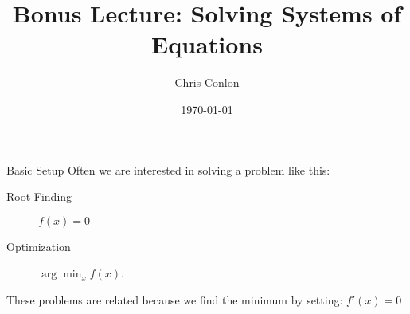 \def\beamerclassoptions{[xcolor=pdftex,dvipsnames,table,mathserif,aspectratio=169]}


\usepackage[english]{babel}
\usepackage{pgf,pgfarrows,pgfnodes,pgfautomata,pgfheaps}
\usepackage{amsmath,amssymb,setspace,centernot,stmaryrd}
\usepackage[latin1]{inputenc}
\usepackage[T1]{fontenc}
\usepackage{relsize}




\newcommand{\norm}[1]{\left\lVert#1\right\rVert}
\newcommand{\R}{\mathbb{R}}
\newcommand{\E}{\mathbb{E}}
\newcommand{\V}{\mathbb{V}}
\newcommand{\ol}{\overline}
\newcommand{\pp}{{\prime \prime}}
\newcommand{\ppp}{{\prime \prime \prime}}
\newcommand{\policy}{\gamma}


\newcommand{\fp}{\frame[plain]}


\title{Bonus Lecture: Solving Systems of Equations}
\author{Chris Conlon  }
\date{\today }


\begin{frame}
\titlepage
\end{frame}

\begin{frame}{Basic Setup}
Often we are interested in solving a problem like this:
\begin{description}
\item[Root Finding] $f(x) = 0 $
\item[Optimization] $\arg \min_x f(x)$.
\end{description}
These problems are related because we find the minimum by setting: $f'(x)=0$
\end{frame}


